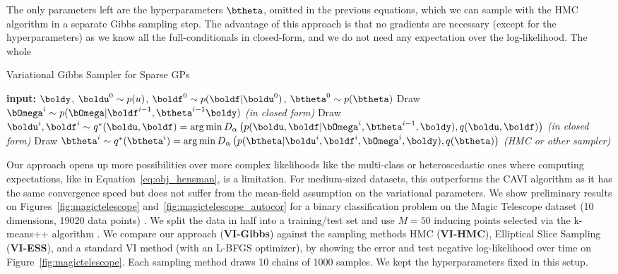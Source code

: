The only parameters left are the hyperparameters $\btheta$, omitted in the previous equations, which we can sample with the \ac{HMC} algorithm in a separate Gibbs sampling step.
The advantage of this approach is that no gradients are necessary (except for the hyperparameters) as we know all the full-conditionals in closed-form, and we do not need any expectation over the log-likelihood.
The whole

\begin{algorithm}[H]
    \caption{Variational Gibbs Sampler for Sparse \ac{GPs}}
    \begin{algorithmic}
        \State \textbf{input:} $\boldy$, $\boldu^0 \sim p(u)$, $\boldf^0 \sim p(\boldf|\boldu^0)$, $\btheta^0 \sim p(\btheta)$
        \State Draw $\bOmega^i \sim p(\bOmega|\boldf^{i-1},\btheta^{i-1}\boldy)$ \textit{(in closed form)}
        \State Draw $\boldu^i,\boldf^i \sim q^*(\boldu,\boldf) = \arg \min D_\alpha\left(p(\boldu,\boldf|\bOmega^i,\btheta^{i-1},\boldy),q(\boldu,\boldf)\right)$ \textit{(in closed form)}
        \State Draw $\btheta^i \sim q^*(\btheta^i) = \arg \min D_\alpha\left(p(\btheta|\boldu^i, \boldf^i, \bOmega^i, \boldy), q(\btheta)\right)$ \textit{(\ac{HMC} or other sampler)}
    \EndFor
    \end{algorithmic}
    \label{alg:sparsegp}
\end{algorithm}


Our approach opens up more possibilities over more complex likelihoods like the multi-class or heteroscedastic ones where computing expectations, like in Equation~\eqref{eq:obj_hensman}, is a limitation.
For medium-sized datasets, this outperforms the \ac{CAVI} algorithm as it has the same convergence speed but does not suffer from the mean-field assumption on the variational parameters.
We show preliminary results on Figures~\ref{fig:magictelescope} and~\ref{fig:magictelescope_autocor} for a binary classification problem on the Magic Telescope dataset (10 dimensions, 19020 data points) \cite{bock2004methods}.
We split the data in half into a training/test set and use $M=50$ inducing points selected via the k-means++ algorithm \cite{arthur2007k}.
We compare our approach (\textbf{VI-Gibbs}) against the sampling methods \ac{HMC} (\textbf{VI-HMC}), Elliptical Slice Sampling (\textbf{VI-ESS}), and a standard \ac{VI} method (with an L-BFGS optimizer), by showing the error and test negative log-likelihood over time on Figure~\ref{fig:magictelescope}.
Each sampling method draws 10 chains of 1000 samples.
We kept the hyperparameters fixed in this setup.

